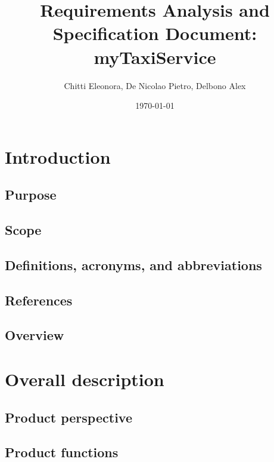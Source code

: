 \documentclass[12pt, a4paper]{report}
\begin{document}
\title{Requirements Analysis and Specification Document: myTaxiService}
\author{Chitti Eleonora, De Nicolao Pietro, Delbono Alex}
\date{\today}
\maketitle
\tableofcontents

\chapter{Introduction}
\label{ch:introduction}

\section{Purpose}


\section{Scope}


\section{Definitions, acronyms, and abbreviations}


\section{References}


\section{Overview}


\chapter{Overall description}
\label{ch:overall-desc}

\section{Product perspective}


\section{Product functions}

\end{document}
